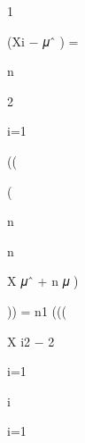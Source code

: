 \documentclass[a4paper,portrait,12pt]{article}
\begin{document}
1


\begin{flushleft}
(Xi $-$ 𝜇ˆ ) =
\end{flushleft}


\begin{flushleft}
n
\end{flushleft}


2





\begin{flushleft}
i=1
\end{flushleft}





((


(





\begin{flushleft}
n
\end{flushleft}





\begin{flushleft}
n
\end{flushleft}





\begin{flushleft}
X 𝜇ˆ + n 𝜇 )
\end{flushleft}


\begin{flushleft}
)) = n1 (((
\end{flushleft}





\begin{flushleft}
X i2 $-$ 2
\end{flushleft}


\begin{flushleft}
i=1
\end{flushleft}





\begin{flushleft}
i
\end{flushleft}





\begin{flushleft}
i=1
\end{flushleft}
\end{document}
